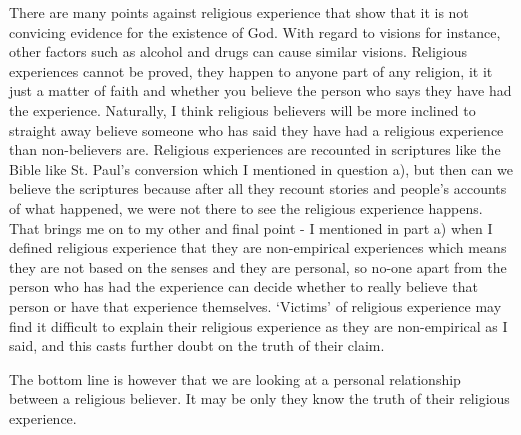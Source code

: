 \documentclass[a4 paper]{article}
\begin{document}
There are many points against religious experience that show that it is not convicing evidence for the existence of God.  With regard to visions for instance, other factors such as alcohol and drugs can cause similar visions.  Religious experiences cannot be proved, they happen to anyone part of any religion, it it just a matter of faith and whether you believe the person who says they have had the experience.  Naturally, I think religious believers will be more inclined to straight away believe someone who has said they have had a religious experience than non-believers are.  Religious experiences are recounted in scriptures like the Bible like St. Paul's conversion which I mentioned in question a), but then can we believe the scriptures because after all they recount stories and people's accounts of what happened, we were not there to see the religious experience happens.  That brings me on to my other and final point - I mentioned in part a) when I defined religious experience that they are non-empirical experiences which means they are not based on the senses and they are personal, so no-one apart from the person who has had the experience can decide whether to really believe that person or have that experience themselves.  `Victims' of religious experience may find it difficult to explain their religious experience as they are non-empirical as I said, and this casts further doubt on the truth of their claim.

The bottom line is however that we are looking at a personal relationship between a religious believer.  It may be only they know the truth of their religious experience.
\end{document}
